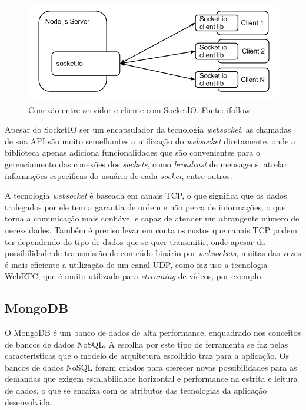 \begin{figure}[!htb]
	\centering
	\includegraphics[scale=0.67]{imagens/socketio.png}
	\caption{\small Conexão entre servidor e cliente com SocketIO. Fonte: ifollow \cite{img-socketio}}
	\label{fig:socketio}
\end{figure}

Apesar do SocketIO ser um encapsulador da tecnologia \textit{websocket}, as chamadas de sua API são muito semelhantes a utilização do \textit{websocket} diretamente, onde a biblioteca apenas adiciona funcionalidades que são convenientes para o gerenciamento das conexões dos \textit{sockets}, como \textit{broadcast} de mensagens, atrelar informações específicas do usuário de cada \textit{socket}, entre outros.

A tecnologia \textit{websocket} é baseada em canais TCP, o que significa que os dados trafegados por ele tem a garantia de ordem e não perca de informações, o que torna a comunicação mais confiável e capaz de atender um abrangente número de necessidades. Também é preciso levar em conta os custos que canais TCP podem ter dependendo do tipo de dados que se quer transmitir, onde apesar da possibilidade de transmissão de conteúdo binário por \textit{websockets}, muitas das vezes é mais eficiente a utilização de um canal UDP, como faz uso a tecnologia WebRTC, que é muito utilizada para \textit{streaming} de vídeos, por exemplo.

\subsection{MongoDB}
O MongoDB é um banco de dados de alta performance, enquadrado nos conceitos de bancos de dados NoSQL. A escolha por este tipo de ferramenta se faz pelas características que o modelo de arquitetura escolhido traz para a aplicação. Os bancos de dados NoSQL foram criados para oferecer novas possibilidades para as demandas que exigem escalabilidade horizontal e performance na estrita e leitura de dados, o que se encaixa com os atributos das tecnologias da aplicação desenvolvida.

